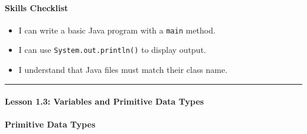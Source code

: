 \documentclass[
  justified,
  openright,
]{tufte-book}
\let\subsection\paragraph
\let\paragraph\paragraph
\let\subsection\paragraph
\let\paragraph\paragraph
\providecommand{\tightlist}{%
  \setlength{\itemsep}{0pt}\setlength{\parskip}{0pt}}
\begin{document}
\subsection{Skills Checklist}\label{skills-checklist-70}

\begin{itemize}
\tightlist
\item[$\square$]
  I can write a basic Java program with a \texttt{main} method.
\item[$\square$]
  I can use \texttt{System.out.println()} to display output.
\item[$\square$]
  I understand that Java files must match their class name.
\end{itemize}

\begin{center}\rule{0.5\linewidth}{0.5pt}\end{center}

\subsection{Lesson 1.3: Variables and Primitive Data
Types}\label{lesson-1.3-variables-and-primitive-data-types-1}

\subsection{Primitive Data Types}\label{primitive-data-types}
\end{document}
